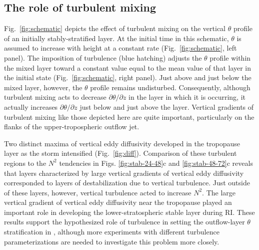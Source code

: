 \documentclass{ametsoc}
\begin{document}
  \subsection{The role of turbulent mixing}

Fig.~\ref{fig:schematic} depicts the effect of turbulent mixing on the vertical $\theta$ profile of an initially stably-stratified layer.
At the initial time in this schematic, $\theta$ is assumed to increase with height at a constant rate (Fig.~\ref{fig:schematic}, left panel).
The imposition of turbulence (blue hatching) adjusts the $\theta$ profile within the mixed layer toward a constant value equal to the mean value of that layer in the initial state (Fig.~\ref{fig:schematic}, right panel).
Just above and just below the mixed layer, however, the $\theta$ profile remains undisturbed.
Consequently, although turbulent mixing acts to decrease $\partial \theta/\partial z$ in the layer in which it is occurring, it actually increases $\partial \theta/\partial z$ just below and just above the layer.
Vertical gradients of turbulent mixing like those depicted here are quite important, particularly on the flanks of the upper-tropospheric outflow jet.

Two distinct maxima of vertical eddy diffusivity developed in the tropopause layer as the storm intensified (Fig.~\ref{fig:diff}).
Comparison of these turbulent regions to the $N^2$ tendencies in Figs. \ref{fig:stab-24-48}c and \ref{fig:stab-48-72}c reveals that layers characterized by large vertical gradients of vertical eddy diffusivity corresponded to layers of destabilization due to vertical turbulence.
Just outside of these layers, however, vertical turbulence acted to increase $N^2$.
The large vertical gradient of vertical eddy diffusivity near the tropopause played an important role in developing the lower-stratospheric stable layer during RI.
These results support the hypothesized role of turbulence in setting the outflow-layer $\theta$ stratification in \cite{EmanuelRotunno2011}, although more experiments with different turbulence parameterizations are needed to investigate this problem more closely.
\end{document}
